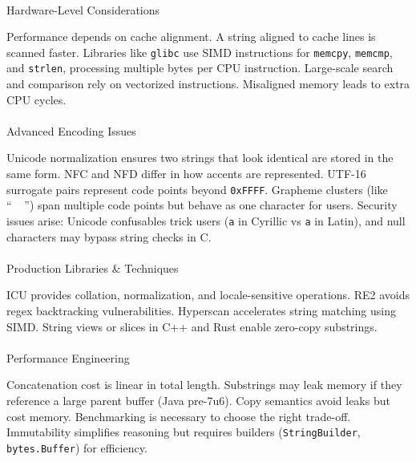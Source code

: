 \documentclass[
  letterpaper,
  DIV=11,
  numbers=noendperiod]{scrreprt}
\makeatletter
\let\oldparagraph\paragraph
\renewcommand{\paragraph}{
    \@ifstar
      \xxxParagraphStar
      \xxxParagraphNoStar
  }
\newcommand{\xxxParagraphStar}[1]{\oldparagraph*{#1}\mbox{}}
\newcommand{\xxxParagraphNoStar}[1]{\oldparagraph{#1}\mbox{}}
\makeatother
\begin{document}
\paragraph{Hardware-Level
Considerations}\label{hardware-level-considerations}

Performance depends on cache alignment. A string aligned to cache lines
is scanned faster. Libraries like \texttt{glibc} use SIMD instructions
for \texttt{memcpy}, \texttt{memcmp}, and \texttt{strlen}, processing
multiple bytes per CPU instruction. Large-scale search and comparison
rely on vectorized instructions. Misaligned memory leads to extra CPU
cycles.

\paragraph{Advanced Encoding Issues}\label{advanced-encoding-issues}

Unicode normalization ensures two strings that look identical are stored
in the same form. NFC and NFD differ in how accents are represented.
UTF-16 surrogate pairs represent code points beyond \texttt{0xFFFF}.
Grapheme clusters (like ``👨‍👩‍👧‍👦'') span multiple code points but behave as
one character for users. Security issues arise: Unicode confusables
trick users (\texttt{а} in Cyrillic vs \texttt{a} in Latin), and null
characters may bypass string checks in C.

\paragraph{Production Libraries \&
Techniques}\label{production-libraries-techniques}

ICU provides collation, normalization, and locale-sensitive operations.
RE2 avoids regex backtracking vulnerabilities. Hyperscan accelerates
string matching using SIMD. String views or slices in C++ and Rust
enable zero-copy substrings.

\paragraph{Performance Engineering}\label{performance-engineering}

Concatenation cost is linear in total length. Substrings may leak memory
if they reference a large parent buffer (Java pre-7u6). Copy semantics
avoid leaks but cost memory. Benchmarking is necessary to choose the
right trade-off. Immutability simplifies reasoning but requires builders
(\texttt{StringBuilder}, \texttt{bytes.Buffer}) for efficiency.
\end{document}
